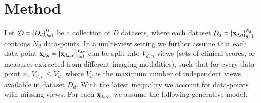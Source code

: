 \section{Method}



Let $\mathcal{D} = \left\{D_d\right\}_{d=1}^D$ be a collection of $D$ datasets, where each dataset $D_d = \left\{\mathbf{x}_{d,n}\right\}_{n=1}^{N_d}$ contains $N_d$ data-points.
In a multi-view setting we further assume that each data-point $\mathbf{x}_{d,n} = \left\{\mathbf{x}_{d,n,v}\right\}_{v=1}^{V_{d,n}}$ can be split into $V_{d,n}$ views (\eg sets of clinical scores, or measures extracted from different imaging modalities),
such that for every data-point $n$, $V_{d,n} \leq V_d$, where $V_d$ is the maximum number of independent views available in dataset $D_d$.
With the latest inequality we account for data-points with missing views.
For each $\mathbf{x}_{d,n,v}$ we assume the following generative model:

